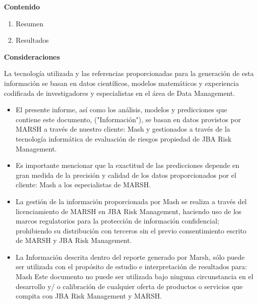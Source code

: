 \documentclass[
]{article}
\begin{document}
\clearpage

\noindent \textbf{\textcolor{turquesa}{\fontsize{16}{20}\selectfont Contenido}}

\noindent

\begin{enumerate}
    \item {\fontsize{11}{13}\selectfont Resumen \dotfill \pageref{sec:summary}}
    \item {\fontsize{11}{13}\selectfont Resultados \dotfill \pageref{sec:results}}
\end{enumerate}

\newpage

\noindent \textbf{\textcolor{turquesa}{\fontsize{16}{20}\selectfont Consideraciones}}
\vspace{0.5cm}

\noindent \fontsize{11}{13}\selectfont La tecnología utilizada y las
referencias proporcionadas para la generación de esta información se
basan en datos científicos, modelos matemáticos y experiencia codificada
de investigadores y especialistas en el área de Data Management.

\begin{itemize}
    \item {\fontsize{11}{13}\selectfont El presente informe, así como los análisis, modelos y predicciones que contiene este documento, ("Información"), se basan en datos provistos por MARSH a través de nuestro cliente: Mash y gestionados a través de la tecnología informática de evaluación de riesgos propiedad de JBA Risk Management.}
    \item {\fontsize{11}{13}\selectfont Es importante mencionar que la exactitud de las predicciones depende en gran medida de la precisión y calidad de los datos proporcionados por el cliente: Mash a los especialistas de MARSH.}
    \item {\fontsize{11}{13}\selectfont La gestión de la información proporcionada por Mash se realiza a través del licenciamiento de MARSH en JBA Risk Management, haciendo uso de los marcos regulatorios para la protección de información confidencial; prohibiendo su distribución con terceros sin el previo consentimiento escrito de MARSH y JBA Risk Management.}
    \item {\fontsize{11}{13}\selectfont La Información descrita dentro del reporte generado por Marsh, sólo puede ser utilizada con el propósito de estudio e interpretación de resultados para: Mash Este documento no puede ser utilizada bajo ninguna circunstancia en el desarrollo y/ o calibración de cualquier oferta de productos o servicios que compita con JBA Risk Management y MARSH.}
\end{itemize}
\end{document}
